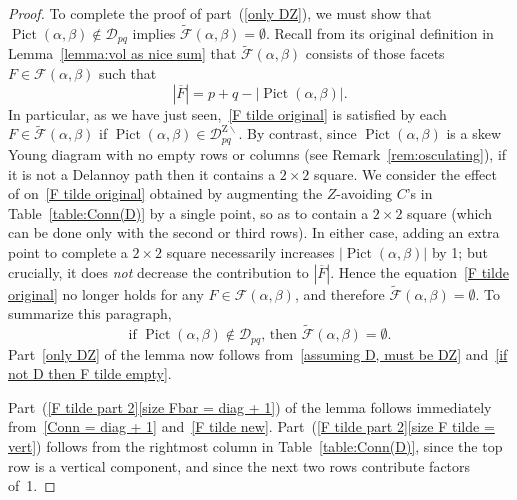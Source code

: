 \documentclass[noamsfonts,10pt]{amsart}
\newcommand{\D}{\mathcal{D}}
\newcommand{\DZ}{\mathcal{D}^{\mathrm{Z} \!\!\!\! \backslash}}
\newcommand{\al}{\alpha}
\newcommand{\be}{\beta}
\DeclareMathOperator{\Pic}{Pict}
\newcommand{\F}{\mathcal{F}}
\newcommand{\1}{\mathbf{1}}
\theoremstyle{plain}
\theoremstyle{definition}
\numberwithin{equation}{section}
\begin{document}
\begin{proof}
    To complete the proof of part~(\ref{only DZ}), we must show that $\Pic(\al,\be) \notin \D_{pq}$ implies $\widetilde{\F}(\al,\be) = \emptyset$.
    Recall from its original definition in Lemma~\ref{lemma:vol as nice sum} that $\widetilde{\F}(\al,\be)$ consists of those facets $F \in \F(\al,\be)$ such that 
    \begin{equation}
        \label{F tilde original}
        |\overline{F}| = p + q - \left| \Pic(\al,\be) \right|.
    \end{equation}
    In particular, as we have just seen,~\eqref{F tilde original} is satisfied by each $F \in \widetilde{\F}(\al,\be)$ if $\Pic(\al,\be) \in \DZ_{pq}$.
    By contrast, since $\Pic(\al,\be)$ is a skew Young diagram with no empty rows or columns (see Remark~\ref{rem:osculating}), if it is not a Delannoy path then it contains a $2 \times 2$ square.
    We consider the effect of on~\eqref{F tilde original} obtained by augmenting the $Z$-avoiding $C$'s in Table~\ref{table:Conn(D)} by a single point, so as to contain a $2 \times 2$ square (which can be done only with the second or third rows).
    In either case, adding an extra point to complete a $2 \times 2$ square necessarily increases $\left| \Pic(\al,\be) \right|$ by 1;
    but crucially, it does \emph{not} decrease the contribution to $|\overline{F}|$.
    Hence the equation~\eqref{F tilde original} no longer holds for any $F \in \F(\al, \be)$, and therefore $\widetilde{\F}(\al, \be) = \emptyset$.
    To summarize this paragraph,
    \begin{equation}
        \label{if not D then F tilde empty}
        \text{if $\Pic(\al,\be) \notin \D_{pq}$, then $\widetilde{\F}(\al,\be) = \emptyset$}.
    \end{equation}
    Part~\eqref{only DZ} of the lemma now follows from~\eqref{assuming D, must be DZ} and~\eqref{if not D then F tilde empty}.

    Part~(\ref{F tilde part 2}\ref{size Fbar = diag + 1}) of the lemma follows immediately from~\eqref{Conn = diag + 1} and~\eqref{F tilde new}.
    Part~(\ref{F tilde part 2}\ref{size F tilde = vert}) follows from the rightmost column in Table~\ref{table:Conn(D)}, since the top row is a vertical component, and since the next two rows contribute factors of~1.
\end{proof}
\end{document}
